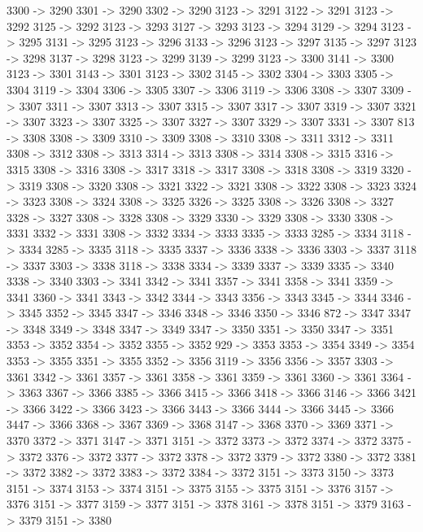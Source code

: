 {	3300 -> 3290
	3301 -> 3290
	3302 -> 3290
	3123 -> 3291
	3122 -> 3291
	3123 -> 3292
	3125 -> 3292
	3123 -> 3293
	3127 -> 3293
	3123 -> 3294
	3129 -> 3294
	3123 -> 3295
	3131 -> 3295
	3123 -> 3296
	3133 -> 3296
	3123 -> 3297
	3135 -> 3297
	3123 -> 3298
	3137 -> 3298
	3123 -> 3299
	3139 -> 3299
	3123 -> 3300
	3141 -> 3300
	3123 -> 3301
	3143 -> 3301
	3123 -> 3302
	3145 -> 3302
	3304 -> 3303
	3305 -> 3304
	3119 -> 3304
	3306 -> 3305
	3307 -> 3306
	3119 -> 3306
	3308 -> 3307
	3309 -> 3307
	3311 -> 3307
	3313 -> 3307
	3315 -> 3307
	3317 -> 3307
	3319 -> 3307
	3321 -> 3307
	3323 -> 3307
	3325 -> 3307
	3327 -> 3307
	3329 -> 3307
	3331 -> 3307
	813 -> 3308
	3308 -> 3309
	3310 -> 3309
	3308 -> 3310
	3308 -> 3311
	3312 -> 3311
	3308 -> 3312
	3308 -> 3313
	3314 -> 3313
	3308 -> 3314
	3308 -> 3315
	3316 -> 3315
	3308 -> 3316
	3308 -> 3317
	3318 -> 3317
	3308 -> 3318
	3308 -> 3319
	3320 -> 3319
	3308 -> 3320
	3308 -> 3321
	3322 -> 3321
	3308 -> 3322
	3308 -> 3323
	3324 -> 3323
	3308 -> 3324
	3308 -> 3325
	3326 -> 3325
	3308 -> 3326
	3308 -> 3327
	3328 -> 3327
	3308 -> 3328
	3308 -> 3329
	3330 -> 3329
	3308 -> 3330
	3308 -> 3331
	3332 -> 3331
	3308 -> 3332
	3334 -> 3333
	3335 -> 3333
	3285 -> 3334
	3118 -> 3334
	3285 -> 3335
	3118 -> 3335
	3337 -> 3336
	3338 -> 3336
	3303 -> 3337
	3118 -> 3337
	3303 -> 3338
	3118 -> 3338
	3334 -> 3339
	3337 -> 3339
	3335 -> 3340
	3338 -> 3340
	3303 -> 3341
	3342 -> 3341
	3357 -> 3341
	3358 -> 3341
	3359 -> 3341
	3360 -> 3341
	3343 -> 3342
	3344 -> 3343
	3356 -> 3343
	3345 -> 3344
	3346 -> 3345
	3352 -> 3345
	3347 -> 3346
	3348 -> 3346
	3350 -> 3346
	872 -> 3347
	3347 -> 3348
	3349 -> 3348
	3347 -> 3349
	3347 -> 3350
	3351 -> 3350
	3347 -> 3351
	3353 -> 3352
	3354 -> 3352
	3355 -> 3352
	929 -> 3353
	3353 -> 3354
	3349 -> 3354
	3353 -> 3355
	3351 -> 3355
	3352 -> 3356
	3119 -> 3356
	3356 -> 3357
	3303 -> 3361
	3342 -> 3361
	3357 -> 3361
	3358 -> 3361
	3359 -> 3361
	3360 -> 3361
	3364 -> 3363
	3367 -> 3366
	3385 -> 3366
	3415 -> 3366
	3418 -> 3366
	3146 -> 3366
	3421 -> 3366
	3422 -> 3366
	3423 -> 3366
	3443 -> 3366
	3444 -> 3366
	3445 -> 3366
	3447 -> 3366
	3368 -> 3367
	3369 -> 3368
	3147 -> 3368
	3370 -> 3369
	3371 -> 3370
	3372 -> 3371
	3147 -> 3371
	3151 -> 3372
	3373 -> 3372
	3374 -> 3372
	3375 -> 3372
	3376 -> 3372
	3377 -> 3372
	3378 -> 3372
	3379 -> 3372
	3380 -> 3372
	3381 -> 3372
	3382 -> 3372
	3383 -> 3372
	3384 -> 3372
	3151 -> 3373
	3150 -> 3373
	3151 -> 3374
	3153 -> 3374
	3151 -> 3375
	3155 -> 3375
	3151 -> 3376
	3157 -> 3376
	3151 -> 3377
	3159 -> 3377
	3151 -> 3378
	3161 -> 3378
	3151 -> 3379
	3163 -> 3379
	3151 -> 3380
}
